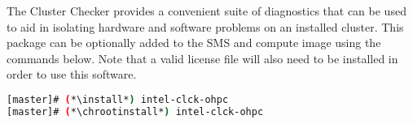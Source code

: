 The \Intel{} Cluster Checker provides a convenient suite of diagnostics that
can be used to aid in isolating hardware and software problems on an installed
cluster. This package can be optionally added to the SMS and compute image
using the commands below. Note that a valid license file will also need to be
installed in order to use this software.

\begin{lstlisting}[language=bash,keywords={}]
[master]# (*\install*) intel-clck-ohpc
[master]# (*\chrootinstall*) intel-clck-ohpc
\end{lstlisting}
